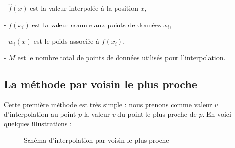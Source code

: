 - \(\hat{f}(x)\) est la valeur interpolée à la position \(x\),

- \(f(x_i)\) est la valeur connue aux points de données \(x_i\),

- \(w_i(x)\) est le poids associée à \(f(x_i)\),

- \(M\) est le nombre total de points de données utilisés pour l'interpolation.




\subsection{La méthode par voisin le plus proche}
Cette première méthode est très simple : nous prenons comme valeur \( v \) d'interpolation au point \( p \) la valeur \( v \) du point le plus proche de \( p \).
En voici quelques illustrations :


\begin{figure}[H]
    \centering
    \caption{Schéma d'interpolation par voisin le plus proche}
    \label{fig:interpolation_voisin}
\end{figure}

